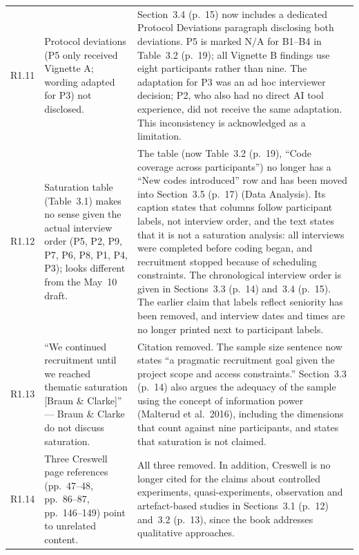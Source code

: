 \documentclass[12pt,a4paper,twoside]{article}
\begin{document}
{\begin{longtable}{p{1cm}p{6.7cm}p{7cm}}
R1.11 &
Protocol deviations (P5 only received Vignette A; wording adapted for P3) not
disclosed. &
Section~3.4 (p.~15) now includes a dedicated Protocol Deviations paragraph disclosing both
deviations. P5 is marked N/A for B1--B4 in Table~3.2 (p.~19); all Vignette B findings use
eight participants rather than nine. The adaptation for P3 was an ad hoc interviewer
decision; P2, who also had no direct AI tool experience, did not receive the same
adaptation. This inconsistency is acknowledged as a limitation. \\

R1.12 &
Saturation table (Table~3.1) makes no sense given the actual interview order (P5, P2,
P9, P7, P6, P8, P1, P4, P3); looks different from the May~10 draft. &
The table (now Table~3.2 (p.~19), ``Code coverage across participants'') no longer has a ``New codes introduced'' row and has been moved into Section~3.5 (p.~17) (Data Analysis). Its caption states that columns follow participant labels, not interview order, and the text states that it is not a saturation analysis: all interviews were completed before coding began, and recruitment stopped because of scheduling constraints. The chronological interview order is given in Sections~3.3 (p.~14) and~3.4 (p.~15). The earlier claim that labels reflect seniority has been removed, and interview dates and times are no longer printed next to participant labels. \\

R1.13 &
``We continued recruitment until we reached thematic saturation [Braun \& Clarke]''
--- Braun \& Clarke do not discuss saturation. &
Citation removed. The sample size sentence now states ``a pragmatic recruitment goal given the project scope and access constraints.'' Section~3.3 (p.~14) also argues the adequacy of the sample using the concept of information power (Malterud et al.\ 2016), including the dimensions that count against nine participants, and states that saturation is not claimed. \\

R1.14 &
Three Creswell page references (pp.~47--48, pp.~86--87, pp.~146--149) point to
unrelated content. &
All three removed. In addition, Creswell is no longer cited for the claims about controlled experiments, quasi-experiments, observation and artefact-based studies in Sections~3.1 (p.~12) and~3.2 (p.~13), since the book addresses qualitative approaches. \\


\end{longtable}}
\end{document}
